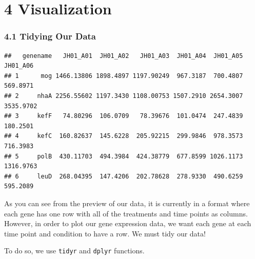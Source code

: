 \documentclass[]{article}
\newenvironment{Shaded}{\begin{snugshade}}{\end{snugshade}}
\newcommand{\KeywordTok}[1]{\textcolor[rgb]{0.13,0.29,0.53}{\textbf{#1}}}
\newcommand{\DataTypeTok}[1]{\textcolor[rgb]{0.13,0.29,0.53}{#1}}
\newcommand{\DecValTok}[1]{\textcolor[rgb]{0.00,0.00,0.81}{#1}}
\newcommand{\StringTok}[1]{\textcolor[rgb]{0.31,0.60,0.02}{#1}}
\newcommand{\CommentTok}[1]{\textcolor[rgb]{0.56,0.35,0.01}{\textit{#1}}}
\newcommand{\OperatorTok}[1]{\textcolor[rgb]{0.81,0.36,0.00}{\textbf{#1}}}
\newcommand{\NormalTok}[1]{#1}
\begin{document}
\section{\texorpdfstring{\textbf{4}
Visualization}{4 Visualization}}\label{visualization}

\subsubsection{\texorpdfstring{\textbf{4.1} Tidying Our
Data}{4.1 Tidying Our Data}}\label{tidying-our-data}

\begin{Shaded}
\end{Shaded}

\begin{verbatim}
##   genename   JH01_A01  JH01_A02   JH01_A03  JH01_A04  JH01_A05  JH01_A06
## 1      mog 1466.13806 1898.4897 1197.90249  967.3187  700.4807  569.8971
## 2     nhaA 2256.55602 1197.3430 1108.00753 1507.2910 2654.3007 3535.9702
## 3     kefF   74.80296  106.0709   78.39676  101.0474  247.4839  180.2501
## 4     kefC  160.82637  145.6228  205.92215  299.9846  978.3573  716.3983
## 5     polB  430.11703  494.3984  424.38779  677.8599 1026.1173 1316.9763
## 6     leuD  268.04395  147.4206  202.78628  278.9330  490.6259  595.2089
\end{verbatim}

As you can see from the preview of our data, it is currently in a format
where each gene has one row with all of the treatments and time points
as columns. However, in order to plot our gene expression data, we want
each gene at each time point and condition to have a row. We must tidy
our data!

To do so, we use \texttt{tidyr} and \texttt{dplyr} functions.
\end{document}
